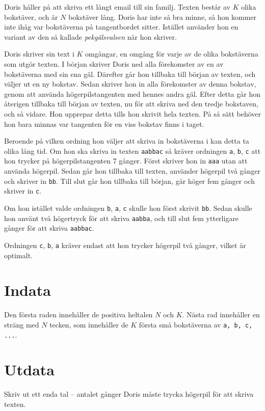 Doris håller på att skriva ett långt email till sin familj.
Texten består av $K$ olika bokstäver, och är $N$ bokstäver lång.
Doris har inte så bra minne, så hon kommer inte ihåg var bokstäverna på tangentbordet sitter.
Istället använder hon en variant av den så kallade \emph{pekgälsvalsen} när hon skriver.

Doris skriver sin text i $K$ omgångar, en omgång för varje av de olika bokstäverna som utgör texten.
I början skriver Doris ned alla förekomster av en av bokstäverna med sin ena gäl.
Därefter går hon tillbaka till början av texten, och väljer ut en ny bokstav.
Sedan skriver hon in alla förekomster av denna bokstav, genom att använda högerpilstangenten med hennes andra gäl.
Efter detta går hon återigen tillbaka till början av texten, nu för att skriva ned den tredje bokstaven, och så vidare.
Hon upprepar detta tills hon skrivit hela texten.
På så sätt behöver hon bara minnas var tangenten för en viss bokstav finns i taget.

Beroende på vilken ordning hon väljer att skriva in bokstäverna i kan detta ta olika lång tid.
Om hon ska skriva in texten \texttt{aabbac} så kräver ordningen \texttt{a}, \texttt{b}, \texttt{c} att hon trycker på högerpilstangenten 7 gånger.
Först skriver hon in \texttt{aaa} utan att använda högerpil.
Sedan går hon tillbaka till texten, använder högerpil två gånger och skriver in \texttt{bb}.
Till slut går hon tillbaka till början, går höger fem gånger och skriver in \texttt{c}.

Om hon istället valde ordningen \texttt{b}, \texttt{a}, \texttt{c} skulle hon först skrivit \texttt{bb}.
Sedan skulle hon använt två högertryck för att skriva \texttt{aabba}, och till slut fem ytterligare gånger för att skriva \texttt{aabbac}.

Ordningen \texttt{c}, \texttt{b}, \texttt{a} kräver endast att hon trycker högerpil två gånger, vilket är optimalt.

\section*{Indata}
Den första raden innehåller de positiva heltalen $N$ och $K$.
Nästa rad innehåller en sträng med $N$ tecken, som innehåller de $K$ första små bokstäverna av \texttt{a, b, c, ...}.

\section*{Utdata}
Skriv ut ett enda tal -- antalet gånger Doris måste trycka högerpil för att skriva texten.

